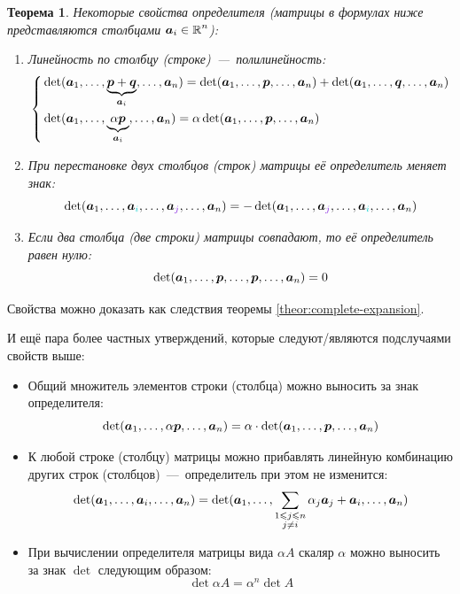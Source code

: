 \documentclass[a4paper,12pt]{article}
\newtheorem{theorem}{Теорема}[section]
\theoremstyle{definition}
\theoremstyle{remark}
\theoremstyle{remark}
\theoremstyle{remark}
\begin{document}
  \begin{theorem}
    Некоторые свойства определителя (матрицы в формулах ниже представляются столбцами $\bds a_i \hm\in \RR^n$):
    \begin{enumerate}
      \item Линейность по столбцу (строке)~---~полилинейность:
        \[
          \left\{
            \begin{aligned}
              &\det (\boldsymbol a_1, \ldots, \underbrace{\boldsymbol p + \boldsymbol q}_{\boldsymbol a_i}, \ldots, \boldsymbol a_n)
                = \det (\boldsymbol a_1, \ldots, \boldsymbol p, \ldots, \boldsymbol a_n)
                + \det (\boldsymbol a_1, \ldots, \boldsymbol q, \ldots, \boldsymbol a_n)\\
              &\det (\boldsymbol a_1, \ldots, \underbrace{\alpha \boldsymbol p}_{\boldsymbol a_i}, \ldots, \boldsymbol a_n)
                = \alpha \det (\boldsymbol a_1, \ldots, \boldsymbol p, \ldots, \boldsymbol a_n)
            \end{aligned}
          \right.
        \]
      \item При перестановке двух столбцов (строк) матрицы её определитель меняет знак:
        \[
          \det (\bds a_1, \ldots, \bds a_{\textcolor{light-cyan}{i}}, \ldots, \bds a_{\textcolor{light-purple}{j}}, \ldots, \bds a_n)
          = -\det (\bds a_1, \ldots, \bds a_{\textcolor{light-purple}{j}}, \ldots, \bds a_{\textcolor{light-cyan}{i}}, \ldots, \bds a_n)
        \]
      \item Если два столбца (две строки) матрицы совпадают, то её определитель равен нулю:
        \[
          \det (\boldsymbol a_1, \ldots, \boldsymbol p, \ldots, \boldsymbol p, \ldots, \boldsymbol a_n) = 0
        \]
    \end{enumerate}
    
  \end{theorem}
  
  Свойства можно доказать как следствия теоремы \ref{theor:complete-expansion}.
  
  И ещё пара более частных утверждений, которые следуют/являются подслучаями свойств выше:
  \begin{itemize}
    \item Общий множитель элементов строки (столбца) можно выносить за знак определителя:
      \[
        \det (\boldsymbol a_1, \ldots, \alpha \boldsymbol p, \ldots, \boldsymbol a_n)
          = \alpha \cdot \det (\boldsymbol a_1, \ldots, \boldsymbol p, \ldots, \boldsymbol a_n)
      \]
    \item К любой строке (столбцу) матрицы можно прибавлять линейную комбинацию других строк (столбцов)~---~определитель при этом не изменится:
      \[
        \det (\boldsymbol a_1, \ldots, \boldsymbol a_i, \ldots, \boldsymbol a_n)
          = \det (\boldsymbol a_1, \ldots, \sum_{\substack{1 \leqslant j \leqslant n\\j \not= i}} \alpha_j \boldsymbol a_j + \boldsymbol a_i, \ldots, \boldsymbol a_n)
      \]
    \item При вычислении определителя матрицы вида $\alpha A$ скаляр $\alpha$ можно выносить за знак $\det$ следующим образом:
      \[
        \det \alpha A = \alpha^n \det A
      \]
  \end{itemize}
  
\end{document}
